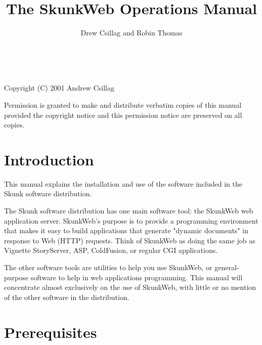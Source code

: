 \documentclass[titlepage]{manual}
\title{The SkunkWeb Operations Manual}
\author{Drew Csillag and Robin Thomas}
\begin{document}
\newcommand{\argdescitem}[1]{\hspace\labelsep
                                \normalfont\ttfamily #1\ }
\newenvironment{argdesc}{\begin{list}{}{
        \renewcommand{\makelabel}{\argdescitem}
}
}{\end{list}}

\newcommand{\doref}[1]{(see section \ref{#1}, page \pageref{#1})}
\newcommand{\nonscope}{[N]}
\newcommand{\PAR}{\texttt{par}}
\newcommand{\swpython}{\texttt{swpython}}

\maketitle
\ 
\vfill 

\noindent
Copyright (C) 2001 Andrew Csillag

\noindent
Permission is granted to make and distribute verbatim copies of
this manual provided the copyright notice and this permission notice
are preserved on all copies.


\tableofcontents


\chapter{Introduction}
   This manual explains the installation and use of the software included
   in the Skunk software distribution.
   
   The Skunk software distribution has one main software tool: the
   SkunkWeb web application server. SkunkWeb's purpose is to provide a
   programming environment that makes it easy to build applications
   that generate "dynamic documents" in response to Web (HTTP)
   requests. Think of SkunkWeb as doing the same job as Vignette
   StoryServer, ASP, ColdFusion, or regular CGI applications.
   
   The other software tools are utilities to help you use SkunkWeb, or
   general-purpose software to help in web applications programming. This
   manual will concentrate almost exclusively on the use of SkunkWeb, with
   little or no mention of the other software in the distribution.
     

\chapter{Prerequisites}
\end{document}
